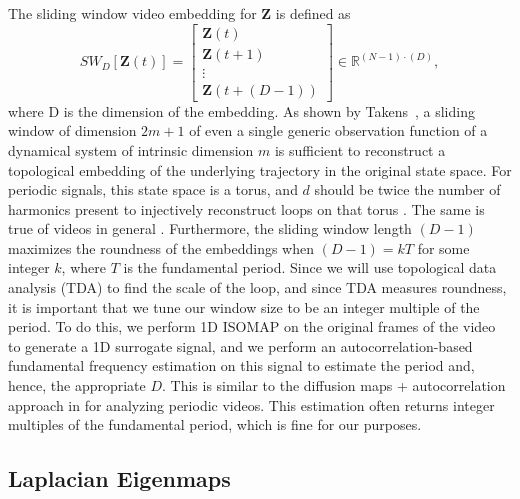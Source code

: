 \documentclass{article}
\newcommand{\mb}{\mathbf}
\begin{document}
The sliding window video embedding \cite{cao1998dynamics,traliehigh,tralie2017quasi} for $\mb{Z}$ is defined as
\begin{equation}
	SW_{D}[\mb{Z}(t)] = \left[ \begin{array}{c} \mb{Z}(t) \\ \mb{Z}(t + 1) \\ \vdots \\ \mb{Z}(t + (D-1))  \end{array} \right] \in \mathbb{R}^{(N-1)\cdot(D)},
\end{equation}
where D is the dimension of the embedding. As shown by Takens~\cite{takens1981detecting}, a sliding window of dimension $2m+1$ of even a single generic observation function of a dynamical system of intrinsic dimension $m$ is sufficient to reconstruct a topological embedding of the underlying trajectory in the original state space.  For periodic signals, this state space is a torus, and $d$ should be twice the number of harmonics present to injectively reconstruct loops on that torus \cite{perea2015sliding}.  The same is true of videos in general \cite{tralie2017quasi}.  Furthermore, the sliding window length $(D-1)$ maximizes the roundness of the embeddings when $(D-1) = k T$ for some integer $k$, where $T$ is the fundamental period.  Since we will use topological data analysis (TDA) to find the scale of the loop, and since TDA measures roundness, it is important that we tune our window size to be an integer multiple of the period.  To do this, we perform 1D ISOMAP \cite{tenenbaum2000global} on the original frames of the video to generate a 1D surrogate signal, and we perform an autocorrelation-based fundamental frequency estimation \cite{Mcleod05asmarter} on this signal to estimate the period and, hence, the appropriate $D$.  This is similar to the diffusion maps + autocorrelation approach in \cite{tralie2017quasi} for analyzing periodic videos.  This estimation often returns integer multiples of the fundamental period, which is fine for our purposes.

\subsection{Laplacian Eigenmaps}
\label{sec:laplacian}
\end{document}
